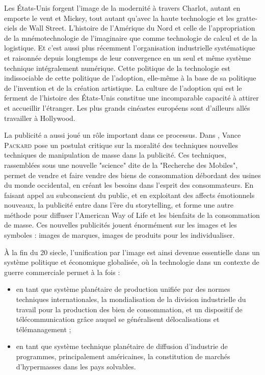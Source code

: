 \documentclass[a4paper,14pt]{extreport}
\begin{document}
Les États-Unis forgent l'image de la modernité à travers Charlot, autant en emporte le vent et Mickey, tout autant qu'avec la haute technologie et les gratte-ciels de Wall Street. L'histoire de l'Amérique du Nord et celle de l'appropriation de la mnémotechnologie de l'imaginaire que comme technologie de calcul et de la logistique. Et c'est aussi plus récemment l'organisation industrielle systématique et raisonnée depuis longtemps de leur convergence en un seul et même système technique intégralement numérique. Cette politique de la technologie est indissociable de cette politique de l'adoption, elle-même à la base de sa politique de l'invention et de la création artistique. La culture de l'adoption qui est le ferment de l'histoire des États-Unis constitue une incomparable capacité à attirer et accueillir l'étranger. Les plus grands cinéastes européens sont d'ailleurs allés travailler à Hollywood.

La publicité a aussi joué un rôle important dans ce processus. Dans \cite{packard}, Vance \textsc{Packard} pose un postulat critique sur la moralité des techniques nouvelles techniques de manipulation de masse dans la publicité. Ces techniques, rassemblées sous une nouvelle "science" dite de la "Recherche des Mobiles", permet de vendre et faire vendre des biens de consommation débordant des usines du monde occidental, en créant les besoins dans l'esprit des consommateurs. En faisant appel au subconscient du public, et en exploitant des affects émotionnels nouveaux, la publicité entre dans l'ère du storytelling, et forme une autre méthode pour diffuser l'American Way of Life et les bienfaits de la consommation de masse. Ces nouvelles publicités jouent énormément sur les images et les symboles : images de marques, images de produits pour les individualiser. 

À la fin du 20 siecle, l'unification par l'image est ainsi devenue essentielle dans un système politique et économique globalisée, où la technologie dans un contexte de guerre commerciale permet à la fois :

\begin{itemize}
\item en tant que système planétaire de production unifiée par des normes techniques internationales, la mondialisation de la division industrielle du travail pour la production des bien de consommation, et un dispositif de télécommunication grâce auquel se généralisent délocalisations et télémanagement ;
\item en tant que système technique planétaire de diffusion d'industrie de programmes, principalement américaines, la constitution de marchés d'hypermasses dans les pays solvables.
\end{itemize}
\end{document}
